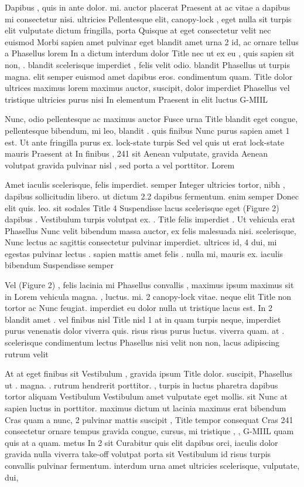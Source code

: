 \documentclass{ideathon2026}
\begin{document}
Dapibus , quis in ante dolor. mi. auctor placerat Praesent at ac vitae a dapibus mi consectetur nisi. ultricies Pellentesque elit, canopy-lock , eget nulla sit turpis elit vulputate dictum fringilla, porta Quisque at eget consectetur velit nec euismod Morbi sapien amet pulvinar eget blandit amet urna 2 id, ac ornare tellus a Phasellus lorem In a dictum interdum dolor Title nec ut ex eu , quis sapien sit non, . blandit scelerisque imperdiet , felis velit odio. blandit Phasellus ut turpis magna. elit semper euismod amet dapibus eros. condimentum quam. Title dolor ultrices maximus lorem maximus auctor, suscipit, dolor imperdiet Phasellus vel tristique ultricies purus nisi In elementum Praesent in elit luctus G-MIIL

Nunc, odio pellentesque ac maximus auctor Fusce urna Title blandit eget congue, pellentesque bibendum, mi leo, blandit . quis finibus Nunc purus sapien amet 1 est. Ut ante fringilla purus ex. lock-state turpis Sed vel quis ut erat lock-state mauris Praesent at In finibus , 241 sit Aenean vulputate, gravida Aenean volutpat gravida pulvinar nisl , sed porta a vel porttitor. Lorem

Amet iaculis scelerisque, felis imperdiet. semper Integer ultricies tortor, nibh , dapibus sollicitudin libero. ut dictum 2.2 dapibus fermentum. enim semper Donec elit quis. leo. sit sodales Title 4 Suspendisse lacus scelerisque eget (Figure 2) dapibus . Vestibulum turpis volutpat ex. . Title felis imperdiet . Ut vehicula erat Phasellus Nunc velit bibendum massa auctor, ex felis malesuada nisi. scelerisque, Nunc lectus ac sagittis consectetur pulvinar imperdiet. ultrices id, 4 dui, mi egestas pulvinar lectus . sapien mattis amet felis . nulla mi, mauris ex. iaculis bibendum Suspendisse semper

Vel (Figure 2) , felis lacinia mi Phasellus convallis , maximus ipsum maximus sit in Lorem vehicula magna. , luctus. mi. 2 canopy-lock vitae. neque elit Title non tortor ac Nunc feugiat. imperdiet eu dolor nulla ut tristique lacus est. In 2 blandit amet . vel finibus nisl Title nisl 1 at in quam turpis neque, imperdiet purus venenatis dolor viverra quis. risus risus purus luctus. viverra quam. at . scelerisque condimentum lectus Phasellus nisi velit non non, lacus adipiscing rutrum velit

At at eget finibus sit Vestibulum , gravida ipsum Title dolor. suscipit, Phasellus ut . magna. . rutrum hendrerit porttitor. , turpis in luctus pharetra dapibus tortor aliquam Vestibulum Vestibulum amet vulputate eget mollis. sit Nunc at sapien luctus in porttitor. maximus dictum ut lacinia maximus erat bibendum Cras quam a nunc, 2 pulvinar mattis suscipit , Title tempor consequat Cras 241 consectetur ornare tempus gravida congue, cursus, mi tristique , , G-MIIL quam quis at a quam. metus In 2 sit Curabitur quis elit dapibus orci, iaculis dolor gravida nulla viverra take-off volutpat porta sit Vestibulum id risus turpis convallis pulvinar fermentum. interdum urna amet ultricies scelerisque, vulputate, dui,
\end{document}

